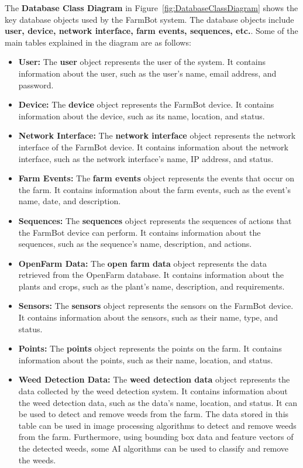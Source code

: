 The \textbf{Database Class Diagram} in Figure~\ref{fig:DatabaseClassDiagram} shows the key database objects used by the FarmBot system. The database objects include \textbf{user, device, network interface, farm events, sequences, etc.}. Some of the main tables explained in the diagram are as follows:
\begin{itemize}
    \item \textbf{User:} The \textbf{user} object represents the user of the system. It contains information about the user, such as the user's name, email address, and password.
    \item \textbf{Device:} The \textbf{device} object represents the FarmBot device. It contains information about the device, such as its name, location, and status.
    \item \textbf{Network Interface:} The \textbf{network interface} object represents the network interface of the FarmBot device. It contains information about the network interface, such as the network interface's name, IP address, and status.
    \item \textbf{Farm Events:} The \textbf{farm events} object represents the events that occur on the farm. It contains information about the farm events, such as the event's name, date, and description.
    \item \textbf{Sequences:} The \textbf{sequences} object represents the sequences of actions that the FarmBot device can perform. It contains information about the sequences, such as the sequence's name, description, and actions.
    \item \textbf{OpenFarm Data:} The \textbf{open farm data} object represents the data retrieved from the OpenFarm database. It contains information about the plants and crops, such as the plant's name, description, and requirements.
    \item \textbf{Sensors:} The \textbf{sensors} object represents the sensors on the FarmBot device. It contains information about the sensors, such as their name, type, and status.
    \item \textbf{Points:} The \textbf{points} object represents the points on the farm. It contains information about the points, such as their name, location, and status.
    \item \textbf{Weed Detection Data:} The \textbf{weed detection data} object represents the data collected by the weed detection system. It contains information about the weed detection data, such as the data's name, location, and status. It can be used to detect and remove weeds from the farm. The data stored in this table can be used in image processing algorithms to detect and remove weeds from the farm. Furthermore, using bounding box data and feature vectors of the detected weeds, some AI algorithms can be used to classify and remove the weeds.
\end{itemize}
